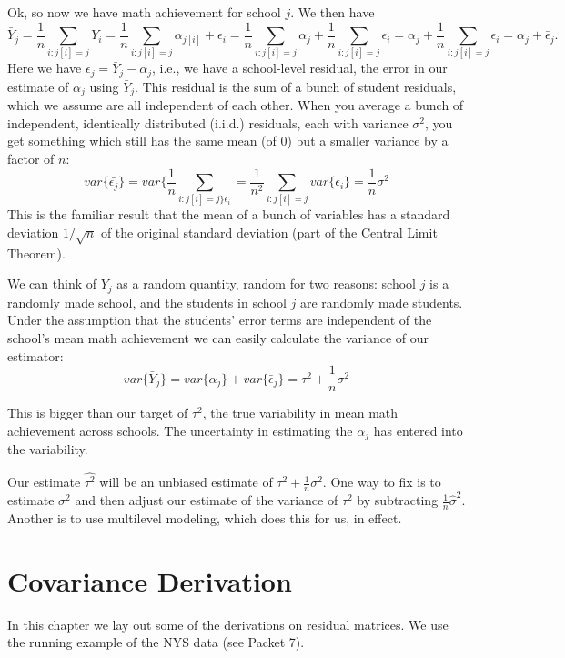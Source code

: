\documentclass[
  letterpaper,
  DIV=11,
  numbers=noendperiod]{scrreprt}
\begin{document}
Ok, so now we have math achievement for school \(j\). We then have
\[\bar{Y}_j = \frac{1}{n} \sum_{i : j[i] = j} Y_i  = \frac{1}{n} \sum_{i : j[i] = j} \alpha_{j[i]} + \epsilon_i =   \frac{1}{n} \sum_{i : j[i] = j} \alpha_j +  \frac{1}{n} \sum_{i : j[i] = j} \epsilon_i = \alpha_j +  \frac{1}{n} \sum_{i : j[i] = j}\epsilon_i = \alpha_j + \bar{\epsilon}_j .\]
Here we have \(\bar{\epsilon}_j = \bar{Y}_j - \alpha_j\), i.e., we have
a school-level residual, the error in our estimate of \(\alpha_j\) using
\(\bar{Y}_j\). This residual is the sum of a bunch of student residuals,
which we assume are all independent of each other. When you average a
bunch of independent, identically distributed (i.i.d.) residuals, each
with variance \(\sigma^2\), you get something which still has the same
mean (of 0) but a smaller variance by a factor of \(n\):
\[var\{ \bar{\epsilon_j} \} = var\{  \frac{1}{n} \sum_{i : j[i] = j\}\epsilon_i } = \frac{1}{n^2} \sum_{i : j[i] = j} var\{ \epsilon_i \} =  \frac{1}{n} \sigma^2\]
This is the familiar result that the mean of a bunch of variables has a
standard deviation \(1/\sqrt{n}\) of the original standard deviation
(part of the Central Limit Theorem).

We can think of \(\bar{Y}_j\) as a random quantity, random for two
reasons: school \(j\) is a randomly made school, and the students in
school \(j\) are randomly made students. Under the assumption that the
students' error terms are independent of the school's mean math
achievement we can easily calculate the variance of our estimator:
\[var\{ \bar{Y}_j \} = var\{ \alpha_j \} + var\{ \bar{\epsilon}_j \} =   \tau^2 +  \frac{1}{n} \sigma^2\]

This is bigger than our target of \(\tau^2\), the true variability in
mean math achievement across schools. The uncertainty in estimating the
\(\alpha_j\) has entered into the variability.

Our estimate \(\widehat{\tau^2}\) will be an unbiased estimate of
\(\tau^2 + \frac{1}{n} \sigma^2\). One way to fix is to estimate
\(\sigma^2\) and then adjust our estimate of the variance of \(\tau^2\)
by subtracting \(\frac{1}{n} \hat{\sigma}^2\). Another is to use
multilevel modeling, which does this for us, in effect.

\chapter{Covariance Derivation}\label{covariance-derivation}

In this chapter we lay out some of the derivations on residual matrices.
We use the running example of the NYS data (see Packet 7).
\end{document}
